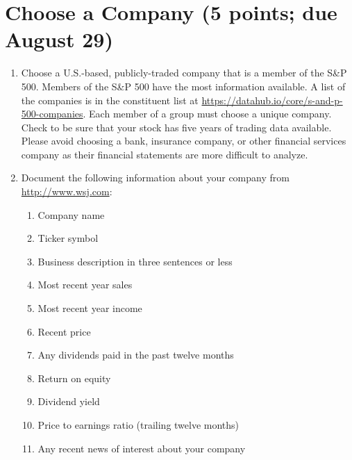 \section{Choose a Company (5 points; due August 29)}
\begin{enumerate}
\item Choose a U.S.-based, publicly-traded company that is a member of the S\&P 500. Members of the S\&P 500 have the most information available. A list of the companies is in the constituent list at  \url{https://datahub.io/core/s-and-p-500-companies}. Each member of a group must choose a unique company. Check to be sure that your stock has five years of trading data available. Please avoid choosing a bank, insurance company, or other financial services company as their financial statements are more difficult to analyze.
\item Document the following information about your company from \url{http://www.wsj.com}:
\begin{multicols}{2}
\begin{enumerate}
\item Company name
\item Ticker symbol
\item Business description in three sentences or less
\item Most recent year sales
\item Most recent year income
\item Recent price
\item Any dividends paid in the past twelve months
\item Return on equity
\item Dividend yield
\item Price to earnings ratio (trailing twelve months)
\item Any recent news of interest about your company
\end{enumerate}
\end{multicols}
\end{enumerate}
